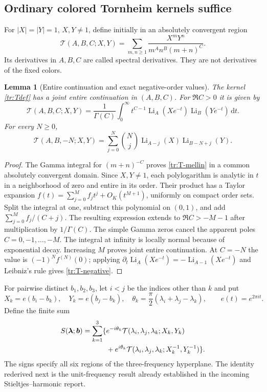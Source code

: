 \documentclass[11pt,a4paper]{article}
\numberwithin{equation}{section}
\newtheorem{lemma}[theorem]{Lemma}
\theoremstyle{definition}
\theoremstyle{remark}
\DeclareMathOperator{\Li}{Li}
\newcommand{\dd}{\,\mathrm d}
\begin{document}
\subsection{Ordinary colored Tornheim kernels suffice}
For $|X|=|Y|=1$, $X,Y\ne1$, define initially in an absolutely convergent
region
\begin{equation}\label{tr:Tdef}
 \mathcal T(A,B,C;X,Y)
     =\sum_{m,n\geq1}\frac{X^mY^n}{m^An^B(m+n)^C}.
\end{equation}
Its derivatives in $A,B,C$ are called spectral derivatives. They are
not derivatives of the fixed colors.

\begin{lemma}[Entire continuation and exact negative-order values]
\label{tr:T-entire}
The kernel \eqref{tr:Tdef} has a joint entire continuation in
$(A,B,C)$. For $\Re C>0$ it is given by
\begin{equation}\label{tr:T-mellin}
 \mathcal T(A,B,C;X,Y)=\frac1{\Gamma(C)}
   \int_0^\infty t^{C-1}\Li_A(Xe^{-t})\Li_B(Ye^{-t})\dd t.
\end{equation}
For every $N\geq0$,
\begin{equation}\label{tr:T-negative}
 \mathcal T(A,B,-N;X,Y)
   =\sum_{j=0}^N\binom Nj\Li_{A-j}(X)\Li_{B-N+j}(Y).
\end{equation}
\end{lemma}
\begin{proof}
The Gamma integral for $(m+n)^{-C}$ proves \eqref{tr:T-mellin} in a
common absolutely convergent domain. Since $X,Y\ne1$, each
polylogarithm is analytic in $t$ in a neighborhood of zero and entire
in its order. Their product has a Taylor expansion
$f(t)=\sum_{j=0}^Mf_jt^j+O_K(t^{M+1})$, uniformly on compact order
sets. Split the integral at one, subtract this polynomial on $(0,1)$,
and add $\sum_{j=0}^Mf_j/(C+j)$. The resulting expression extends to
$\Re C>-M-1$ after multiplication by $1/\Gamma(C)$. The simple Gamma
zeros cancel the apparent poles $C=0,-1,\ldots,-M$. The integral at
infinity is locally normal because of exponential decay. Increasing
$M$ proves joint entire continuation. At $C=-N$ the value is
$(-1)^Nf^{(N)}(0)$; applying
$\partial_t\Li_A(Xe^{-t})=-\Li_{A-1}(Xe^{-t})$ and Leibniz's rule
gives \eqref{tr:T-negative}.
\end{proof}

For pairwise distinct $b_1,b_2,b_3$, let $i<j$ be the indices other
than $k$ and put
\[
 X_k=e(b_i-b_k),\quad Y_k=e(b_j-b_k),\quad
 \theta_k=\frac\pi2(\lambda_i+\lambda_j-\lambda_k),
 \qquad e(t)=e^{2\pi it}.
\]
Define the finite sum
\begin{align}\label{tr:Sdef}
 S(\boldsymbol\lambda;\boldsymbol b)
 =\sum_{k=1}^3\{&e^{-i\theta_k}
      \mathcal T(\lambda_i,\lambda_j,\lambda_k;X_k,Y_k)\notag\\
 &+e^{i\theta_k}
      \mathcal T(\lambda_i,\lambda_j,\lambda_k;X_k^{-1},Y_k^{-1})\}.
\end{align}
The signs specify all six regions of the three-frequency hyperplane.
The identity rederived next is the unit-frequency result already
established in the incoming Stieltjes--harmonic report.
\end{document}
